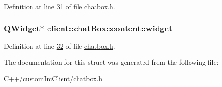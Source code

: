 Definition at line \hyperlink{chatbox_8h_source_l00031}{31} of file \hyperlink{chatbox_8h_source}{chatbox.\-h}.

\hypertarget{structclient_1_1chat_box_1_1content_a29b3c580e5b2c7ded4d0653d56a4f9de}{
\subsubsection[{widget}]{\setlength{\rightskip}{0pt plus 5cm}Q\-Widget$\ast$ client\-::chat\-Box\-::content\-::widget}}\label{d9/d25/structclient_1_1chat_box_1_1content_a29b3c580e5b2c7ded4d0653d56a4f9de}


Definition at line \hyperlink{chatbox_8h_source_l00032}{32} of file \hyperlink{chatbox_8h_source}{chatbox.\-h}.



The documentation for this struct was generated from the following file\-:\begin{DoxyCompactItemize}
\item 
C++/custom\-Irc\-Client/\hyperlink{chatbox_8h}{chatbox.\-h}\end{DoxyCompactItemize}

